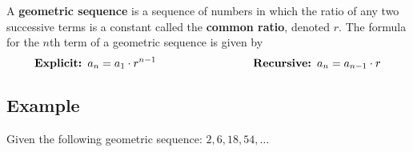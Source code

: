 \documentclass[addpoints]{exam}
\begin{document}
\begin{tcolorbox}[title=Definition: \textit{Geometric Sequence},title filled,colframe=black,sharpish corners,width=\linewidth]

A \textbf{geometric sequence} is a sequence of numbers in which the ratio of any two successive terms is a constant called the \textbf{common ratio}, denoted $r$. The formula for the $n$th term of a geometric sequence is given by
\[\textbf{Explicit:  }a_n = a_1 \cdot r^{n-1}\hspace{1.2in}\textbf{Recursive: }a_n=a_{n-1}\cdot r\]
    
\end{tcolorbox}
\subsection*{Example}\label{subsec:example3}
\begin{questions}
    \question Given the following geometric sequence: $2, 6, 18, 54, \ldots$


\end{questions}

\newpage
\end{document}
